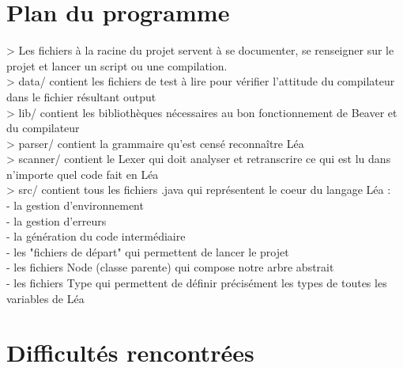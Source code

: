 \documentclass{article}
\begin{document}
\section{Plan du programme}


> Les fichiers à la racine du projet servent à se documenter, se renseigner sur le projet et lancer un script ou une compilation.\\
> data/ contient les fichiers de test à lire pour vérifier l'attitude du compilateur dans le fichier résultant output\\
> lib/ contient les bibliothèques nécessaires au bon fonctionnement de Beaver et du compilateur\\
> parser/ contient la grammaire qu'est censé reconnaître Léa\\
> scanner/ contient le Lexer qui doit analyser et retranscrire ce qui est lu dans n'importe quel code fait en Léa\\
> src/ contient tous les fichiers .java qui représentent le coeur du langage Léa :\\
    - la gestion d'environnement\\
    - la gestion d'erreurs\\
    - la génération du code intermédiaire\\
    - les "fichiers de départ" qui permettent de lancer le projet\\
    - les fichiers Node (classe parente) qui compose notre arbre abstrait\\
    - les fichiers Type qui permettent de définir précisément les types de toutes les variables de Léa\\

\newpage

\section{Difficultés rencontrées}
\end{document}
